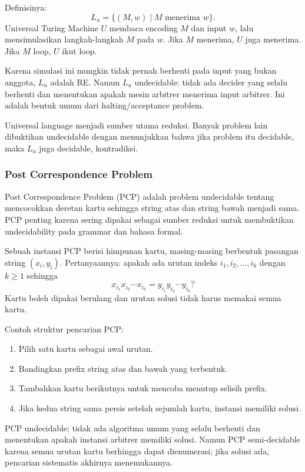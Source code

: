 Definisinya:
\[
    L_u=\{(M,w)\mid M \text{ menerima } w\}.
\]
Universal Turing Machine $U$ membaca encoding $M$ dan input $w$, lalu mensimulasikan langkah-langkah $M$ pada $w$. Jika $M$ menerima, $U$ juga menerima. Jika $M$ loop, $U$ ikut loop.

Karena simulasi ini mungkin tidak pernah berhenti pada input yang bukan anggota, $L_u$ adalah RE. Namun $L_u$ undecidable: tidak ada decider yang selalu berhenti dan menentukan apakah mesin arbitrer menerima input arbitrer. Ini adalah bentuk umum dari halting/acceptance problem.

Universal language menjadi sumber utama reduksi. Banyak problem lain dibuktikan undecidable dengan menunjukkan bahwa jika problem itu decidable, maka $L_u$ juga decidable, kontradiksi.

\subsubsection{Post Correspondence Problem}

\begin{jawab}
Post Correspondence Problem (PCP) adalah problem undecidable tentang mencocokkan deretan kartu sehingga string atas dan string bawah menjadi sama. PCP penting karena sering dipakai sebagai sumber reduksi untuk membuktikan undecidability pada grammar dan bahasa formal.
\end{jawab}

Sebuah instansi PCP berisi himpunan kartu, masing-masing berbentuk pasangan string $(x_i,y_i)$. Pertanyaannya: apakah ada urutan indeks $i_1,i_2,\ldots,i_k$ dengan $k\geq 1$ sehingga
\[
    x_{i_1}x_{i_2}\cdots x_{i_k}
    =
    y_{i_1}y_{i_2}\cdots y_{i_k}?
\]
Kartu boleh dipakai berulang dan urutan solusi tidak harus memakai semua kartu.

Contoh struktur pencarian PCP:
\begin{enumerate}
    \item Pilih satu kartu sebagai awal urutan.
    \item Bandingkan prefix string atas dan bawah yang terbentuk.
    \item Tambahkan kartu berikutnya untuk mencoba menutup selisih prefix.
    \item Jika kedua string sama persis setelah sejumlah kartu, instansi memiliki solusi.
\end{enumerate}

PCP undecidable: tidak ada algoritma umum yang selalu berhenti dan menentukan apakah instansi arbitrer memiliki solusi. Namun PCP semi-decidable karena semua urutan kartu berhingga dapat dienumerasi; jika solusi ada, pencarian sistematis akhirnya menemukannya.

